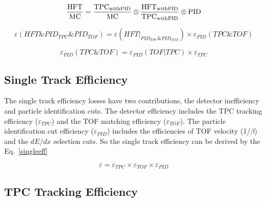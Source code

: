 \documentclass[a4paper]{article}
\begin{document}
\begin{equation}
  \frac{\textup{HFT}}{\textup{MC}} =  \frac{\textup{TPC}_\textup{{withPID}}}{\textup{MC}} \otimes \frac{\textup{HFT}_\textup{{withPID}}}{\textup{TPC}_\textup{{withPID}}} \otimes \textup{PID}
\label{effEqu2}
\end{equation}

\begin{equation}
  \varepsilon(HFT \& PID_{TPC} \& PID_{TOF}) = \varepsilon(HFT | _{PID_{TPC} \& PID_{TOF}}) \times \varepsilon_{PID}(TPC\&TOF)
\label{effEqu3}
\end{equation}

\begin{equation}
  \varepsilon_{PID}(TPC\&TOF) = \varepsilon_{PID}(TOF | TPC) \times \varepsilon_{TPC}
\label{effEqu4}
\end{equation}

\subsection{Single Track Efficiency}

The single track efficiency losses have two contributions, the detector inefficiency and particle identification cuts. The detector efficiency includes the TPC tracking efficiency ($\varepsilon_{TPC}$) and the TOF matching efficiency ($\varepsilon_{TOF}$). The particle identification cut efficiency ($\varepsilon_{PID}$) includes the efficiencies of TOF velocity (1/$\beta$) and the $dE/dx$ selection cuts. So the single track efficiency can be derived by the Eq.~\ref{singleeff}

\begin{equation}
\varepsilon = \varepsilon_{TPC} \times \varepsilon_{TOF} \times \varepsilon_{PID}
\label{singleeff}
\end{equation}

\subsection{TPC Tracking Efficiency}
\end{document}

